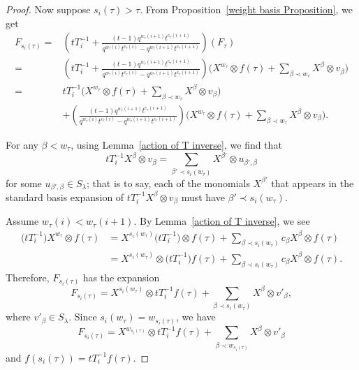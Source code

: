 \documentclass[pdftex]{sigma}
\numberwithin{equation}{section}
\theoremstyle{definition}
\begin{document}
\begin{proof}
 Now suppose $s_i(\tau) > \tau$. From Proposition~\ref{weight basis Proposition}, we get
 \begin{align*}
 F_{s_i(\tau)} ={}& \left( tT_{i}^{-1} + \frac{(t-1)q^{w_{\tau}(i+1)}t^{c_{\tau}(i+1)}}{q^{w_{\tau}(i)}t^{c_{\tau}(i)}-q^{w_{\tau}(i+1)}t^{c_{\tau}(i+1)}}\right)(F_{\tau}) \\
 ={}& \left( tT_{i}^{-1} + \frac{(t-1)q^{w_{\tau}(i+1)}t^{c_{\tau}(i+1)}}{q^{w_{\tau}(i)}t^{c_{\tau}(i)}-q^{w_{\tau}(i+1)}t^{c_{\tau}(i+1)}}\right) \biggl(X^{w_{\tau}}\otimes f(\tau) + \sum_{\beta \prec w_{\tau}} X^{\beta}\otimes v_{\beta} \biggr) \\
 ={}& tT_{i}^{-1}\biggl(X^{w_{\tau}}\otimes f(\tau) + \sum_{\beta \prec w_{\tau}} X^{\beta}\otimes v_{\beta} \biggr) \\
 & + \left(\frac{(t-1)q^{w_{\tau}(i+1)}t^{c_{\tau}(i+1)}}{q^{w_{\tau}(i)}t^{c_{\tau}(i)}-q^{w_{\tau}(i+1)}t^{c_{\tau}(i+1)}}\right) \biggl(X^{w_{\tau}}\otimes f(\tau) + \sum_{\beta \prec w_{\tau}} X^{\beta}\otimes v_{\beta} \biggr).
 \end{align*}

 For any $\beta < w_{\tau}$, using Lemma~\ref{action of T inverse}, we find that
 \[
 tT_i^{-1}X^{\beta} \otimes v_{\beta} = \sum_{\beta' \prec s_i(w_{\tau})}X^{\beta'} \otimes u_{\beta',\beta}
 \]
 for some $u_{\beta',\beta} \in S_{\lambda}$; that is to say, each of the monomials $X^{\beta'}$ that appears in the standard basis expansion of $tT_i^{-1}X^{\beta} \otimes v_{\beta}$ must have $\beta'\prec s_i(w_{\tau})$.

 Assume $w_{\tau}(i)< w_{\tau}(i+1)$. By Lemma~\ref{action of T inverse}, we see
 \begin{align*}
 \bigl(tT_i^{-1}\bigr)X^{w_{\tau}}\otimes f(\tau) &= X^{s_i(w_{\tau})}\bigl(tT_i^{-1}\bigr)\otimes f(\tau) + \sum_{\beta \prec s_i(w_{\tau})} c_{\beta}X^{\beta}\otimes f(\tau) \\
 & = X^{s_i(w_{\tau})}\otimes \bigl(tT_i^{-1}\bigr)f(\tau) + \sum_{\beta \prec s_i(w_{\tau})} c_{\beta}X^{\beta}\otimes f(\tau).
 \end{align*}
 Therefore, $F_{s_i(\tau)}$ has the expansion
 \[
 F_{s_i(\tau)} = X^{s_i(w_{\tau})}\otimes tT_i^{-1}f(\tau) + \sum_{\beta \prec s_i(w_{\tau})} X^{\beta}\otimes v'_{\beta},
 \]
 where $v'_{\beta} \in S_{\lambda}$. Since $s_i(w_{\tau}) = w_{s_{i}(\tau)}$, we have
 \[
 F_{s_i(\tau)} = X^{w_{s_{i}(\tau)}}\otimes tT_i^{-1}f(\tau) + \sum_{\beta \prec w_{s_{i}(\tau)}} X^{\beta}\otimes v'_{\beta}
 \]
 and $f(s_i(\tau)) = tT_i^{-1}f(\tau)$.


\end{proof}
\end{document}
